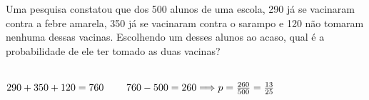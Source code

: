 \begin{ex}
Uma pesquisa constatou que dos 500 alunos de uma escola, 290 já se vacinaram contra a febre amarela, 350 já se vacinaram contra o sarampo e 120 não tomaram nenhuma dessas vacinas. Escolhendo um desses alunos ao acaso, qual é a probabilidade de ele ter tomado as duas vacinas?
  \begin{sol}
   \phantom{A} \\
   $290+350+120=760\hspace{0,8cm} 760-500=260 \Longrightarrow p=\frac{260}{500}=\frac{13}{25}$
  \end{sol}
\end{ex}